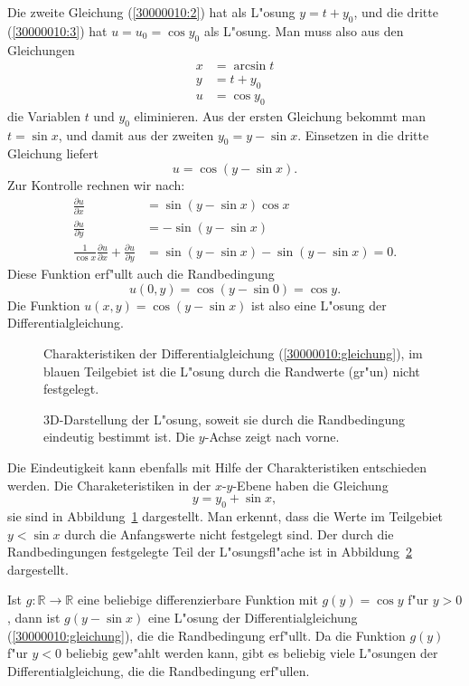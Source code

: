 \begin{loesung}
\begin{teilaufgaben}
Die zweite Gleichung (\ref{30000010:2}) hat als L"osung $y=t+y_0$, und
die dritte (\ref{30000010:3}) hat $u=u_0=\cos y_0$ als L"osung.
Man muss also aus den Gleichungen
\begin{align*}
x&=\arcsin t\\
y&=t+y_0\\
u&=\cos y_0
\end{align*}
die Variablen $t$ und $y_0$ eliminieren.
Aus der ersten Gleichung bekommt man $t=\sin x$, und damit aus der zweiten
$y_0=y-\sin x$. Einsetzen in die dritte Gleichung liefert
\begin{equation}
u=\cos(y-\sin x).
\end{equation}
Zur Kontrolle rechnen wir nach:
\begin{align*}
\frac{\partial u}{\partial x}&=\sin(y-\sin x)\cos x
\\
\frac{\partial u}{\partial y}&=-\sin(y-\sin x)
\\
\frac1{\cos x}\frac{\partial u}{\partial x}+\frac{\partial u}{\partial y}
&=
\sin(y-\sin x)-\sin(y-\sin x)=0.
\end{align*}
Diese Funktion erf"ullt auch die Randbedingung
\begin{equation*}
u(0,y)=\cos(y-\sin 0)=\cos y.
\end{equation*}
Die Funktion $u(x,y)=\cos(y-\sin x)$ ist also eine L"osung der
Differentialgleichung.
\item
\begin{figure}
\centering
{}
\caption{Charakteristiken der Differentialgleichung (\ref{30000010:gleichung}),
im blauen Teilgebiet ist die L"osung durch die Randwerte (gr"un) nicht
festgelegt.
\label{30000010:char}}
\end{figure}
\begin{figure}
\centering
{}
\caption{3D-Darstellung der L"osung, soweit sie durch die Randbedingung
eindeutig bestimmt ist. Die $y$-Achse zeigt nach vorne.
\label{30000010:loesungsflaeche}}
\end{figure}
Die Eindeutigkeit kann ebenfalls mit Hilfe der Charakteristiken entschieden
werden.
Die Charaketeristiken in der $x$-$y$-Ebene haben die Gleichung
\[
y=y_0 + \sin x,
\]
sie sind in Abbildung~\ref{30000010:char} dargestellt.
Man erkennt, dass die Werte im Teilgebiet $y < \sin x$ durch die
Anfangswerte nicht festgelegt sind.
Der durch die Randbedingungen festgelegte Teil der L"osungsfl"ache ist
in Abbildung~\ref{30000010:loesungsflaeche} dargestellt.

Ist $g\colon\mathbb R\to\mathbb R$ eine beliebige differenzierbare Funktion mit
$g(y)=\cos y$ f"ur $y>0$, dann ist $g(y-\sin x)$ eine L"osung der
Differentialgleichung (\ref{30000010:gleichung}), die die Randbedingung
erf"ullt. Da die Funktion $g(y)$ f"ur $y<0$ beliebig gew"ahlt werden
kann, gibt es beliebig viele L"osungen der Differentialgleichung,
die die Randbedingung erf"ullen.
\end{teilaufgaben}
\end{loesung}


